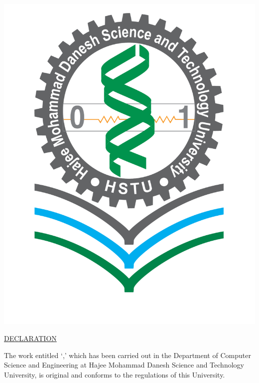 \begin{center}
\large
{}\\
\\
\\
\\
\vspace{10pt}

\includegraphics[scale=0.15]{images/hstu_logo.png}

\underline{\Large {DECLARATION}}
\end{center}
\vspace{20pt}

The work entitled `\textit{\textbf{\thesistitle}},' which has been carried out in the Department of Computer Science and Engineering at Hajee Mohammad Danesh Science and Technology University, is original and conforms to the regulations of this University. 

